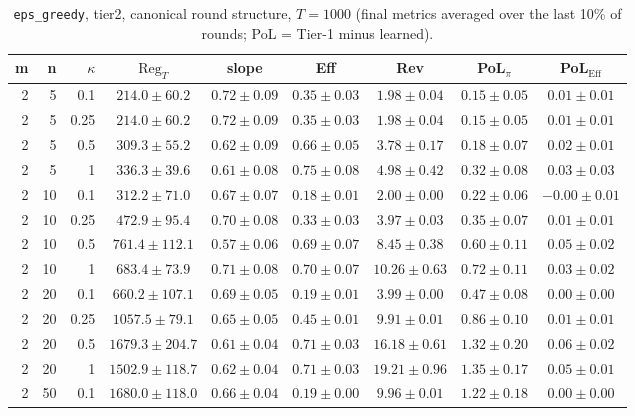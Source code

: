 \begin{table}[htbp]
\centering
\scriptsize
\caption{\texttt{eps\_greedy}, tier2, canonical round structure, $T=1000$ (final metrics averaged over the last 10\% of rounds; PoL = Tier-1 minus learned).}
\label{tab:tier2_eps_greedy_canonical}
\begin{tabular}{@{}rrrcccccc@{}}
\toprule
m & n & $\kappa$ & $\mathrm{Reg}_T$ & slope & Eff & Rev & PoL$_\pi$ & PoL$_\mathrm{Eff}$ \\
\midrule
2 & 5 & 0.1 & $214.0 \pm 60.2$ & $0.72 \pm 0.09$ & $0.35 \pm 0.03$ & $1.98 \pm 0.04$ & $0.15 \pm 0.05$ & $0.01 \pm 0.01$ \\
2 & 5 & 0.25 & $214.0 \pm 60.2$ & $0.72 \pm 0.09$ & $0.35 \pm 0.03$ & $1.98 \pm 0.04$ & $0.15 \pm 0.05$ & $0.01 \pm 0.01$ \\
2 & 5 & 0.5 & $309.3 \pm 55.2$ & $0.62 \pm 0.09$ & $0.66 \pm 0.05$ & $3.78 \pm 0.17$ & $0.18 \pm 0.07$ & $0.02 \pm 0.01$ \\
2 & 5 & 1 & $336.3 \pm 39.6$ & $0.61 \pm 0.08$ & $0.75 \pm 0.08$ & $4.98 \pm 0.42$ & $0.32 \pm 0.08$ & $0.03 \pm 0.03$ \\
2 & 10 & 0.1 & $312.2 \pm 71.0$ & $0.67 \pm 0.07$ & $0.18 \pm 0.01$ & $2.00 \pm 0.00$ & $0.22 \pm 0.06$ & $-0.00 \pm 0.01$ \\
2 & 10 & 0.25 & $472.9 \pm 95.4$ & $0.70 \pm 0.08$ & $0.33 \pm 0.03$ & $3.97 \pm 0.03$ & $0.35 \pm 0.07$ & $0.01 \pm 0.01$ \\
2 & 10 & 0.5 & $761.4 \pm 112.1$ & $0.57 \pm 0.06$ & $0.69 \pm 0.07$ & $8.45 \pm 0.38$ & $0.60 \pm 0.11$ & $0.05 \pm 0.02$ \\
2 & 10 & 1 & $683.4 \pm 73.9$ & $0.71 \pm 0.08$ & $0.70 \pm 0.07$ & $10.26 \pm 0.63$ & $0.72 \pm 0.11$ & $0.03 \pm 0.02$ \\
2 & 20 & 0.1 & $660.2 \pm 107.1$ & $0.69 \pm 0.05$ & $0.19 \pm 0.01$ & $3.99 \pm 0.00$ & $0.47 \pm 0.08$ & $0.00 \pm 0.00$ \\
2 & 20 & 0.25 & $1057.5 \pm 79.1$ & $0.65 \pm 0.05$ & $0.45 \pm 0.01$ & $9.91 \pm 0.01$ & $0.86 \pm 0.10$ & $0.01 \pm 0.01$ \\
2 & 20 & 0.5 & $1679.3 \pm 204.7$ & $0.61 \pm 0.04$ & $0.71 \pm 0.03$ & $16.18 \pm 0.61$ & $1.32 \pm 0.20$ & $0.06 \pm 0.02$ \\
2 & 20 & 1 & $1502.9 \pm 118.7$ & $0.62 \pm 0.04$ & $0.71 \pm 0.03$ & $19.21 \pm 0.96$ & $1.35 \pm 0.17$ & $0.05 \pm 0.01$ \\
2 & 50 & 0.1 & $1680.0 \pm 118.0$ & $0.66 \pm 0.04$ & $0.19 \pm 0.00$ & $9.96 \pm 0.01$ & $1.22 \pm 0.18$ & $0.00 \pm 0.00$ \\

\end{tabular}
\end{table}
